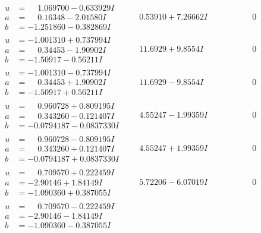 \documentclass[1p]{elsarticle_modified}
\theoremstyle{definition}
\begin{document}
$$\begin{array}{c|c|c}
\begin{aligned}
u &= \phantom{-}1.069700 - 0.633929 I \\
a &= \phantom{-}0.16348 - 2.01580 I \\
b &= -1.251860 - 0.382869 I\end{aligned}
 & \phantom{-}0.53910 + 7.26662 I & \phantom{-0.000000 } 0 \\ \hline\begin{aligned}
u &= -1.001310 + 0.737994 I \\
a &= \phantom{-}0.34453 - 1.90902 I \\
b &= -1.50917 - 0.56211 I\end{aligned}
 & \phantom{-}11.6929 + 9.8554 I & \phantom{-0.000000 } 0 \\ \hline\begin{aligned}
u &= -1.001310 - 0.737994 I \\
a &= \phantom{-}0.34453 + 1.90902 I \\
b &= -1.50917 + 0.56211 I\end{aligned}
 & \phantom{-}11.6929 - 9.8554 I & \phantom{-0.000000 } 0 \\ \hline\begin{aligned}
u &= \phantom{-}0.960728 + 0.809195 I \\
a &= \phantom{-}0.343260 - 0.121407 I \\
b &= -0.0794187 - 0.0837330 I\end{aligned}
 & \phantom{-}4.55247 - 1.99359 I & \phantom{-0.000000 } 0 \\ \hline\begin{aligned}
u &= \phantom{-}0.960728 - 0.809195 I \\
a &= \phantom{-}0.343260 + 0.121407 I \\
b &= -0.0794187 + 0.0837330 I\end{aligned}
 & \phantom{-}4.55247 + 1.99359 I & \phantom{-0.000000 } 0 \\ \hline\begin{aligned}
u &= \phantom{-}0.709570 + 0.222459 I \\
a &= -2.90146 + 1.84149 I \\
b &= -1.090360 + 0.387055 I\end{aligned}
 & \phantom{-}5.72206 - 6.07019 I & \phantom{-0.000000 } 0 \\ \hline\begin{aligned}
u &= \phantom{-}0.709570 - 0.222459 I \\
a &= -2.90146 - 1.84149 I \\
b &= -1.090360 - 0.387055 I\end{aligned}

\end{array}$$
\end{document}
